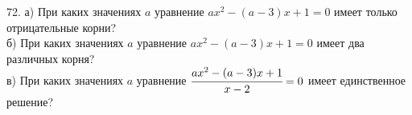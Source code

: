 72. а) При каких значениях $a$ уравнение $ax^2-(a-3)x+1=0$ имеет только отрицательные корни?\\
б) При каких значениях $a$ уравнение $ax^2-(a-3)x+1=0$ имеет два различных корня?\\
в) При каких значениях $a$ уравнение $\cfrac{ax^2-(a-3)x+1}{x-2}=0$ имеет единственное решение?\\
